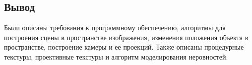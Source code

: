 \subsection*{Вывод}
Были описаны требования к программному обеспечению, алгоритмы для построения сцены в пространстве изображения, изменения положения объекта в пространстве, построение камеры и ее проекций. Также описаны процедурные текстуры, проективные текстуры и алгоритм моделирования неровностей.